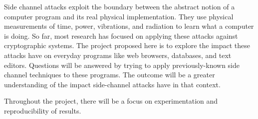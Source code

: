\documentclass{acm_proc_article-sp}
\begin{document}
Side channel attacks exploit the boundary between the abstract notion of
a computer program and its real physical implementation. They use physical
measurements of time, power, vibrations, and radiation to learn what a computer
is doing. So far, most research has focused on applying these attacks against
cryptographic systems. The project proposed here is to explore the impact these
attacks have on everyday programs like web browsers, databases, and text
editors. Questions will be answered by trying to apply previously-known side
channel techniques to these programs. The outcome will be a greater
understanding of the impact side-channel attacks have in that context.

Throughout the project, there will be a focus on experimentation and
reproducibility of results.



\end{document}

